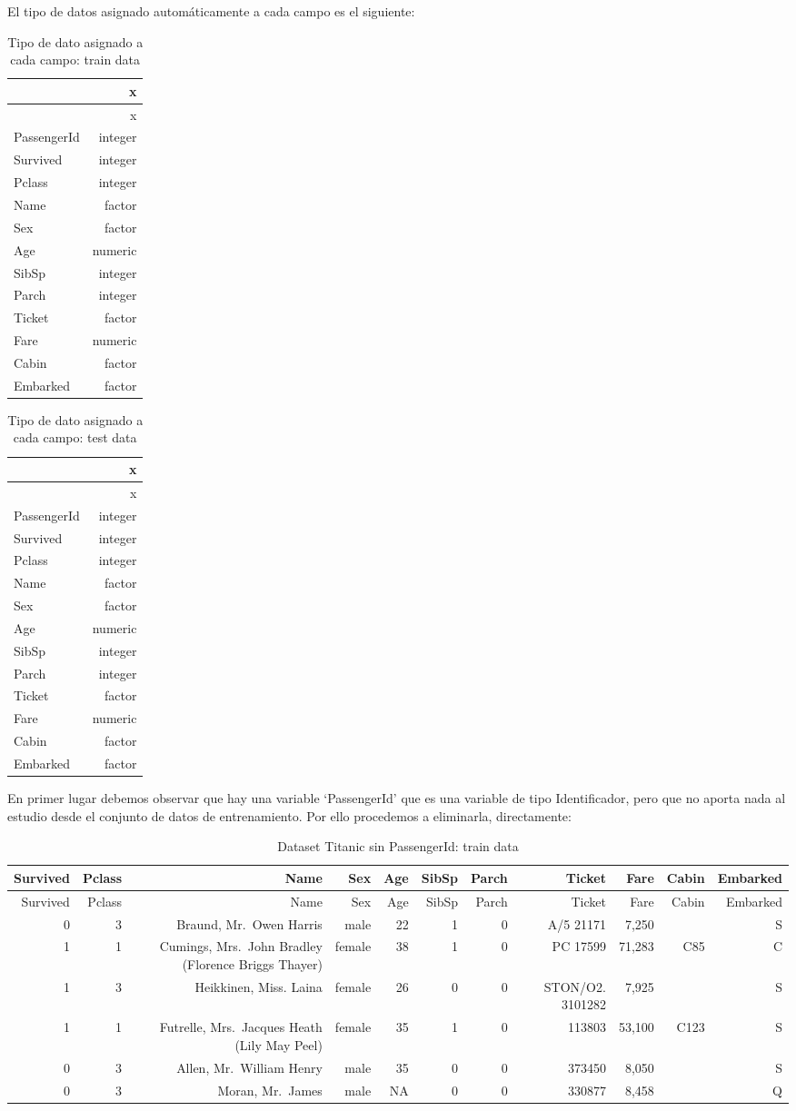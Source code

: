 \documentclass[]{article}
\begin{document}
El tipo de datos asignado automáticamente a cada campo es el siguiente:

\begin{longtable}[]{@{}lr@{}}
\caption{Tipo de dato asignado a cada campo: train data}\tabularnewline
\toprule
& x\tabularnewline
\midrule
\endfirsthead
\toprule
& x\tabularnewline
\midrule
\endhead
PassengerId & integer\tabularnewline
Survived & integer\tabularnewline
Pclass & integer\tabularnewline
Name & factor\tabularnewline
Sex & factor\tabularnewline
Age & numeric\tabularnewline
SibSp & integer\tabularnewline
Parch & integer\tabularnewline
Ticket & factor\tabularnewline
Fare & numeric\tabularnewline
Cabin & factor\tabularnewline
Embarked & factor\tabularnewline
\bottomrule
\end{longtable}

\begin{longtable}[]{@{}lr@{}}
\caption{Tipo de dato asignado a cada campo: test data}\tabularnewline
\toprule
& x\tabularnewline
\midrule
\endfirsthead
\toprule
& x\tabularnewline
\midrule
\endhead
PassengerId & integer\tabularnewline
Survived & integer\tabularnewline
Pclass & integer\tabularnewline
Name & factor\tabularnewline
Sex & factor\tabularnewline
Age & numeric\tabularnewline
SibSp & integer\tabularnewline
Parch & integer\tabularnewline
Ticket & factor\tabularnewline
Fare & numeric\tabularnewline
Cabin & factor\tabularnewline
Embarked & factor\tabularnewline
\bottomrule
\end{longtable}

En primer lugar debemos observar que hay una variable `PassengerId' que
es una variable de tipo Identificador, pero que no aporta nada al
estudio desde el conjunto de datos de entrenamiento. Por ello procedemos
a eliminarla, directamente:

\begin{longtable}[]{@{}rrrrrrrrrrr@{}}
\caption{Dataset Titanic sin PassengerId: train data}\tabularnewline
\toprule
Survived & Pclass & Name & Sex & Age & SibSp & Parch & Ticket & Fare &
Cabin & Embarked\tabularnewline
\midrule
\endfirsthead
\toprule
Survived & Pclass & Name & Sex & Age & SibSp & Parch & Ticket & Fare &
Cabin & Embarked\tabularnewline
\midrule
\endhead
0 & 3 & Braund, Mr.~Owen Harris & male & 22 & 1 & 0 & A/5 21171 & 7,250
& & S\tabularnewline
1 & 1 & Cumings, Mrs.~John Bradley (Florence Briggs Thayer) & female &
38 & 1 & 0 & PC 17599 & 71,283 & C85 & C\tabularnewline
1 & 3 & Heikkinen, Miss. Laina & female & 26 & 0 & 0 & STON/O2. 3101282
& 7,925 & & S\tabularnewline
1 & 1 & Futrelle, Mrs.~Jacques Heath (Lily May Peel) & female & 35 & 1 &
0 & 113803 & 53,100 & C123 & S\tabularnewline
0 & 3 & Allen, Mr.~William Henry & male & 35 & 0 & 0 & 373450 & 8,050 &
& S\tabularnewline
0 & 3 & Moran, Mr.~James & male & NA & 0 & 0 & 330877 & 8,458 & &
Q\tabularnewline
\bottomrule
\end{longtable}
\end{document}
